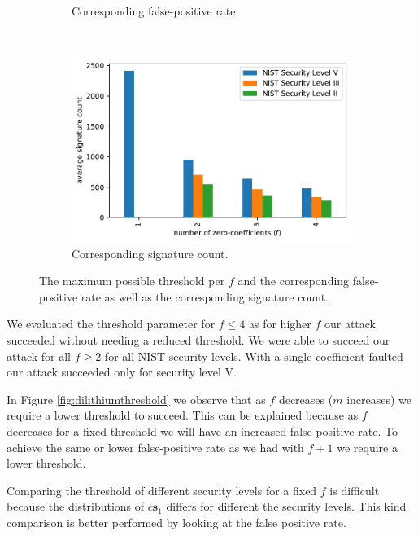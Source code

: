 \begin{figure}
\begin{subfigure}{.5\textwidth}
		\caption{Corresponding false-positive rate.\phantom{}}%
		\label{fig:dilithiumthresholdfpr}%
	\end{subfigure}\\\vspace{1em}%
	\begin{subfigure}{.5\textwidth}%
		\centering%
		\includegraphics[width=.95\linewidth]{plots/dilithium_threshold_sigcount}%
		\caption{Corresponding signature count.}%
		\label{fig:dilithiumthresholdsigcount}%
	\end{subfigure}%
%
	\caption{The maximum possible threshold per $f$ and the corresponding false-positive rate as well as the corresponding signature count.}
	\label{fig:dilithiumthresholdall}%
\end{figure}
We evaluated the threshold parameter for $f \leq 4$ as for higher $f$ our attack succeeded without needing a reduced threshold.
We were able to succeed our attack for all $f \geq 2$ for all NIST security levels. With a single coefficient faulted our attack succeeded only for security level V.

In Figure \ref{fig:dilithiumthreshold} we observe that as $f$ decreases ($m$ increases) we require a lower threshold to succeed. This can be explained because as $f$ decreases for a fixed threshold we will have an increased false-positive rate. To achieve the same or lower false-positive rate as we had with $f + 1$ we require a lower threshold. 

Comparing the threshold of different security levels for a fixed $f$ is difficult because the distributions of $c\bm{s}_1$ differs for different the security levels. This kind comparison is better performed by looking at the false positive rate. 


